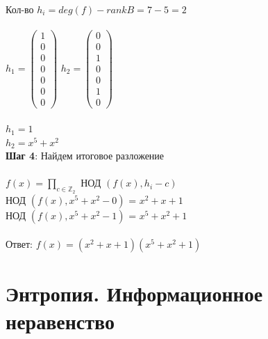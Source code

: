 \documentclass[12pt]{article}
\begin{document}
    Кол-во $h_i = deg(f) - rank B = 7 - 5 = 2$\\\\
$h_1= \begin{pmatrix}
    1 \\
    0 \\
    0 \\
    0 \\
    0 \\
    0 \\
    0
\end{pmatrix}$
$h_2= \begin{pmatrix}
    0 \\
    0 \\
    1 \\
    0 \\
    0 \\
    1 \\
    0
\end{pmatrix}$\\\\
$h_1 = 1$\\
$h_2 = x^5 + x^2$\\
    \textbf{Шаг 4}: Найдем итоговое разложение\\\\
$f(x) = \underset{c \in \mathbb{Z}_2}{\prod}$ НОД $(f(x), h_i - c)$\\
    НОД $(f(x), x^5 + x^2 - 0)$ = $x^2 + x + 1$\\
    НОД $(f(x), x^5 + x^2 - 1)$ = $x^5 + x^2 + 1$\\\\
    Ответ: $f(x) = (x^2 + x + 1)(x^5 + x^2 + 1)$

    \section{Энтропия. Информационное неравенство}
\end{document}
